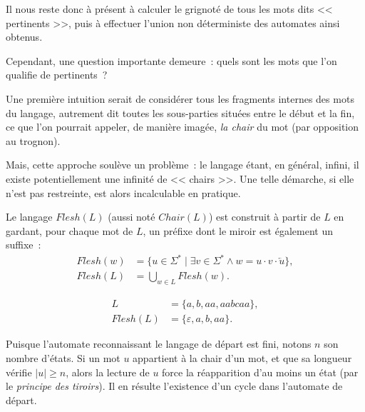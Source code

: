 Il nous reste donc à présent à calculer le grignoté de tous les mots dits
<< pertinents >>, puis à effectuer l'union non déterministe des automates
ainsi obtenus.

\vphantom{}

Cependant, une question importante demeure~: quels sont les mots que l’on
qualifie de pertinents~?

\vphantom{}

Une première intuition serait de considérer tous les fragments internes des
mots du langage, autrement dit toutes les sous-parties situées entre le début
et la fin, ce que l’on pourrait appeler, de manière imagée, \textit{la chair}
du mot (par opposition au trognon).

\vphantom{}

Mais, cette approche soulève un problème~: le langage étant, en général,
infini, il existe potentiellement une infinité de << chairs >>. Une telle
démarche, si elle n’est pas restreinte, est alors incalculable en pratique.

\begin{definition}
  Le langage \(Flesh(L)\) (aussi noté \(Chair(L)\)) est construit à partir de
  \(L\) en gardant, pour chaque mot de \(L\), un préfixe dont le miroir est
  également un suffixe~:
  \begin{align*}
    Flesh(w) &= \{u \in \Sigma^* \mid \exists v \in \Sigma^* \land w = u
    \cdot v \cdot \overleftarrow{u}\}, \\
    Flesh(L) &= \bigcup_{w \in L} Flesh(w).
  \end{align*}
\end{definition}

\begin{example}
  \vspace{-\baselineskip}
  \begin{align*}
    L &= \{a, b, aa, aabcaa\}, \\
    Flesh(L) &= \{\varepsilon, a, b, aa\}.
  \end{align*}
\end{example}

Puisque l’automate reconnaissant le langage de départ est fini, notons \(n\)
son nombre d’états. Si un mot \(u\) appartient à la chair d’un mot, et que sa
longueur vérifie \(\lvert u \rvert \geq n\), alors la lecture de \(u\) force
la réapparition d’au moins un état (par le \textit{principe des tiroirs}). Il
en résulte l’existence d’un cycle dans l'automate de départ.

